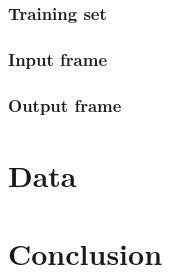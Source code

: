 \documentclass{scrartcl}
\begin{document}
\subsubsection{Training set}
\label{sec:}

\subsubsection{Input frame}
\label{sec:}

\subsubsection{Output frame}
\label{sec:}

\section{Data}

\section{Conclusion} 













%



\end{document}
